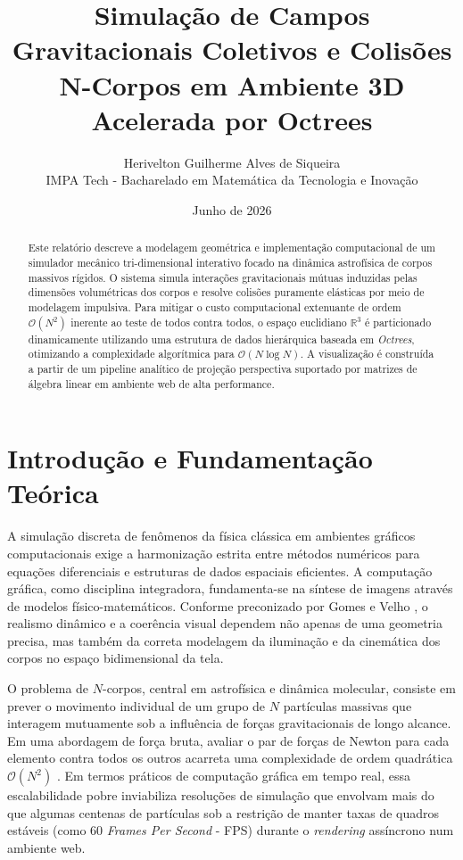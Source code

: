 \documentclass[11pt,a4paper]{article}
\title{\textbf{Simulação de Campos Gravitacionais Coletivos e Colisões N-Corpos em Ambiente 3D Acelerada por Octrees}}
\author{Herivelton Guilherme Alves de Siqueira \\ \small{IMPA Tech - Bacharelado em Matemática da Tecnologia e Inovação}}
\date{Junho de 2026}
\begin{document}
\maketitle

\begin{abstract}
Este relatório descreve a modelagem geométrica e implementação computacional de um simulador mecânico tri-dimensional interativo focado na dinâmica astrofísica de corpos massivos rígidos. O sistema simula interações gravitacionais mútuas induzidas pelas dimensões volumétricas dos corpos e resolve colisões puramente elásticas por meio de modelagem impulsiva. Para mitigar o custo computacional extenuante de ordem $\mathcal{O}(N^2)$ inerente ao teste de todos contra todos, o espaço euclidiano $\mathbb{R}^3$ é particionado dinamicamente utilizando uma estrutura de dados hierárquica baseada em \textit{Octrees}, otimizando a complexidade algorítmica para $\mathcal{O}(N \log N)$. A visualização é construída a partir de um pipeline analítico de projeção perspectiva suportado por matrizes de álgebra linear em ambiente web de alta performance.
\end{abstract}

\section{Introdução e Fundamentação Teórica}

A simulação discreta de fenômenos da física clássica em ambientes gráficos computacionais exige a harmonização estrita entre métodos numéricos para equações diferenciais e estruturas de dados espaciais eficientes. A computação gráfica, como disciplina integradora, fundamenta-se na síntese de imagens através de modelos físico-matemáticos. Conforme preconizado por Gomes e Velho \cite{gomesvelho}, o realismo dinâmico e a coerência visual dependem não apenas de uma geometria precisa, mas também da correta modelagem da iluminação e da cinemática dos corpos no espaço bidimensional da tela.

O problema de $N$-corpos, central em astrofísica e dinâmica molecular, consiste em prever o movimento individual de um grupo de $N$ partículas massivas que interagem mutuamente sob a influência de forças gravitacionais de longo alcance. Em uma abordagem de força bruta, avaliar o par de forças de Newton para cada elemento contra todos os outros acarreta uma complexidade de ordem quadrática $\mathcal{O}(N^2)$ \cite{hockney}. Em termos práticos de computação gráfica em tempo real, essa escalabilidade pobre inviabiliza resoluções de simulação que envolvam mais do que algumas centenas de partículas sob a restrição de manter taxas de quadros estáveis (como 60 \textit{Frames Per Second} - FPS) durante o \textit{rendering} assíncrono num ambiente web.
\end{document}
